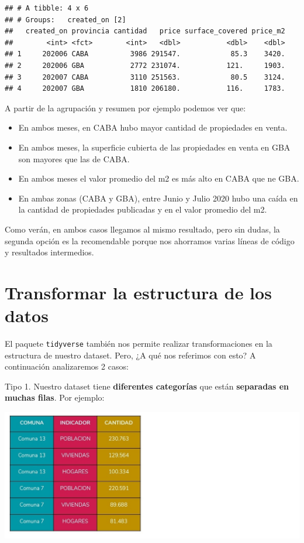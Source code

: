 \documentclass[
  spanish,
]{book}
\providecommand{\tightlist}{%
  \setlength{\itemsep}{0pt}\setlength{\parskip}{0pt}}
\begin{document}
\begin{verbatim}
## # A tibble: 4 x 6
## # Groups:   created_on [2]
##   created_on provincia cantidad   price surface_covered price_m2
##        <int> <fct>        <int>   <dbl>           <dbl>    <dbl>
## 1     202006 CABA          3986 291547.            85.3    3420.
## 2     202006 GBA           2772 231074.           121.     1903.
## 3     202007 CABA          3110 251563.            80.5    3124.
## 4     202007 GBA           1810 206180.           116.     1783.
\end{verbatim}

A partir de la agrupación y resumen por ejemplo podemos ver que:

\begin{itemize}
\tightlist
\item
  En ambos meses, en CABA hubo mayor cantidad de propiedades en venta.
\item
  En ambos meses, la superficie cubierta de las propiedades en venta en GBA son mayores que las de CABA.
\item
  En ambos meses el valor promedio del m2 es más alto en CABA que ne GBA.
\item
  En ambas zonas (CABA y GBA), entre Junio y Julio 2020 hubo una caída en la cantidad de propiedades publicadas y en el valor promedio del m2.
\end{itemize}

Como verán, en ambos casos llegamos al mismo resultado, pero sin dudas, la segunda opción es la recomendable porque nos ahorramos varias líneas de código y resultados intermedios.

\hypertarget{transformar-la-estructura-de-los-datos}{%
\section{Transformar la estructura de los datos}\label{transformar-la-estructura-de-los-datos}}

El paquete \texttt{tidyverse} también nos permite realizar transformaciones en la estructura de nuestro dataset. Pero, ¿A qué nos referimos con esto? A continuación analizaremos 2 casos:

Tipo 1. Nuestro dataset tiene \textbf{diferentes categorías} que están \textbf{separadas en muchas filas}. Por ejemplo:

\includegraphics{images/opcion2.jpg}
\end{document}
